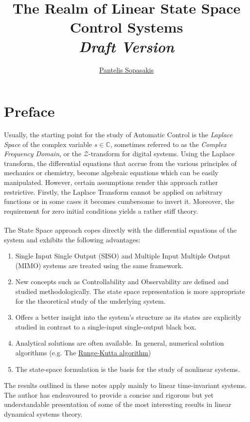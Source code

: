 \documentclass[a4paper,10pt,oneside]{book}
\title{The Realm of Linear State Space Control Systems\\\textit{Draft Version}}
\author{
  \href{mailto:chvng@mail.ntua.gr}{Pantelis Sopasakis}
}
\affil{Dipl. Chem. Eng., Msc. Appl. Math.,\\National Technical University of Athens}
\begin{document}
\maketitle

\chapter*{Preface}
Usually, the starting point for the study of Automatic Control 
is the \emph{Laplace Space} of the complex variable $s\in\mathbb{C}$,
sometimes referred to as the \emph{Complex Frequency Domain},
or the $\mathcal{Z}$-transform for digital systems. 
Using the Laplace transform, the differential equations that accrue 
from the various principles of mechanics or chemistry, become algebraic 
equations which can be easily manipulated. However, certain assumptions
render this approach rather restrictive. Firstly, the Laplace Transform cannot
be applied on arbitrary functions or in some cases it becomes cumbersome to
invert it. Moreover, the requirement for zero initial conditions yields a rather
stiff theory.\\
\\
The State Space approach copes directly with the differential equations of 
the system and exhibits the following advantages:

\begin{enumerate}
 \item Single Input Single Output (SISO) and Multiple Input Multiple Output (MIMO) systems are treated using the same framework. 
 \item New concepts such as Controllability and Observability are defined and studied methodologically. The state space representation is more appropriate for the theoretical study of the underlying system.
 \item Offers a better insight into the system's structure as its states are explicitly studied in contrast to a single-input single-output black box.
 \item Analytical solutions are often available. In general, numerical solution algorithms (e.g. The \href{http://en.wikipedia.org/wiki/Runge\%E2\%80\%93Kutta_methods}{Runge-Kutta algorithm})
 \item The state-space formulation is the basis for the study of nonlinear systems.
\end{enumerate}

The results outlined in these notes apply mainly to linear time-invariant systems. The author has endeavoured to provide a concise and rigorous but yet understandable presentation of some of the most interesting results in linear dynamical systems theory.
\end{document}
